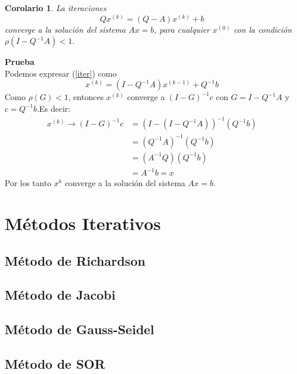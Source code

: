 \documentclass[11pt,a4paper]{article}
\newtheorem{mycorol}{Corolario}[mytheo]
\begin{document}
\begin{mycorol}
	La iteraciones
	\begin{equation}\label{iter}
		Qx^{(k)} = (Q-A)x^{(k)} + b
	\end{equation}
	converge a la solución del sistema $Ax=b$, para cualquier $x^{(0)}$ con la condición $\rho (I-Q^{-1}A) < 1$.
\end{mycorol} 

\textbf{Prueba}\\
Podemos expresar (\ref{iter}) como
$$x^{(k)} = (I-Q^{-1}A)x^{(k-1)} +Q^{-1}b$$
Como $\rho (G) < 1$, entonces $x^{(k)}$ converge a $(I-G)^{-1}c$ con $G=I-Q^{-1}A$ y $c = Q^{-1}b$.Es decir:
\begin{align*}
	x^{(k)} \rightarrow (I-G)^{-1}c &= \left(I-(I-Q^{-1}A)\right)^{-1}\left(Q^{-1}b\right)\\
			&= (Q^{-1}A)^{-1}(Q^{-1}b)\\
			&= (A^{-1}Q)(Q^{-1}b)\\
			&= A^{-1}b = x
\end{align*}
Por los tanto $x^{k}$ converge a la solución del sistema $Ax=b$.
 


\section{Métodos Iterativos}
\subsection{Método de Richardson}
\subsection{Método de Jacobi}
\subsection{Método de Gauss-Seidel}
\subsection{Método de SOR}
\end{document}
